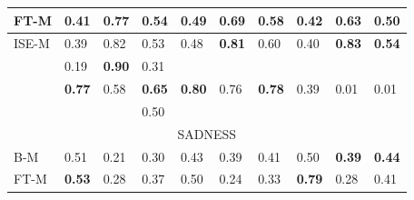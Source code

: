 \documentclass[11pt]{article}
\begin{document}
\begin{table}[!h]
\begin{tabular}{|l||l|l|l||l|l|l||l|l|l|}
\hline
    \tiny{FT-M} & 
    \footnotesize{0.41} & 
    \footnotesize{0.77} & 
    \footnotesize{0.54} & 
    \footnotesize{0.49} & 
    \footnotesize{0.69} & 
    \footnotesize{0.58} &
    \footnotesize{\textbf{0.42}} & 
    \footnotesize{0.63} & 
    \footnotesize{0.50} \\ 

\hline
    \tiny{ISE-M} & 
    \footnotesize{0.39} & 
    \footnotesize{0.82} & 
    \footnotesize{0.53} & 
    \footnotesize{0.48} & 
    \footnotesize{\textbf{0.81}} & 
    \footnotesize{0.60} & 
    \footnotesize{{0.40}} & 
    \footnotesize{\textbf{0.83}} & 
    \footnotesize{\textbf{0.54}} \\ 

\hline 
    \tiny{\cite{strapparava2008learning} } &
    \footnotesize{0.19} & 
    \footnotesize{\textbf{0.90}} & 
    \footnotesize{0.31} &
    &
    &
    &
    &
    &
    \\

\hline
    \tiny{\cite{kim2010evaluation}} &
    \footnotesize{\textbf{0.77}} & 
    \footnotesize{0.58} & 
    \footnotesize{\textbf{0.65}} &
    \footnotesize{\textbf{0.80}} & 
    \footnotesize{{0.76}} & 
    \footnotesize{\textbf{0.78}} &
    \footnotesize{0.39} & 
    \footnotesize{0.01} & 
    \footnotesize{0.01} \\
    
\hline
    \tiny{\cite{danisman2008feeler}} &
    \footnotesize{} & 
    \footnotesize{} & 
    \footnotesize{0.50} &
    \footnotesize{} & 
    \footnotesize{} & 
    \footnotesize{} &
    \footnotesize{} & 
    \footnotesize{} & 
    \footnotesize{} \\
    
\hline
\hline
    \multicolumn{10}{|c|}{{SADNESS}} \\ 
    
\hline
    \tiny{B-M} & 
    \footnotesize{0.51} & 
    \footnotesize{0.21} & 
    \footnotesize{0.30} & 
    \footnotesize{0.43} & 
    \footnotesize{0.39} & 
    \footnotesize{0.41} & 
    \footnotesize{0.50} & 
    \footnotesize{\textbf{0.39}} & 
    \footnotesize{\textbf{0.44}} \\ 

\hline
    \tiny{FT-M} & 
    \footnotesize{\textbf{0.53}} & 
    \footnotesize{0.28} & 
    \footnotesize{0.37} & 
    \footnotesize{0.50} & 
    \footnotesize{0.24} & 
    \footnotesize{0.33} & 
    \footnotesize{\textbf{0.79}} & 
    \footnotesize{0.28} & 
    \footnotesize{0.41} \\ 


\end{tabular}
\end{table}
\end{document}
